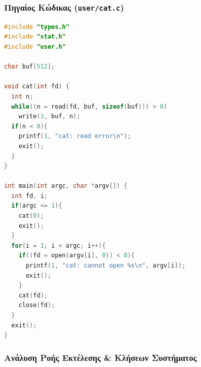 \documentclass[11pt,a4paper]{article}
\begin{document}
\subsubsection*{Πηγαίος Κώδικας (\texttt{user/cat.c})}
\begin{lstlisting}[language=C, caption={Πηγαίος κώδικας του προγράμματος cat (user/cat.c)}]
#include "types.h"
#include "stat.h"
#include "user.h"

char buf[512];

void cat(int fd) {
  int n;
  while((n = read(fd, buf, sizeof(buf))) > 0)
    write(1, buf, n);
  if(n < 0){
    printf(1, "cat: read error\n");
    exit();
  }
}

int main(int argc, char *argv[]) {
  int fd, i;
  if(argc <= 1){
    cat(0);
    exit();
  }
  for(i = 1; i < argc; i++){
    if((fd = open(argv[i], 0)) < 0){
      printf(1, "cat: cannot open %s\n", argv[i]);
      exit();
    }
    cat(fd);
    close(fd);
  }
  exit();
}
\end{lstlisting}

\clearpage
\subsubsection*{Ανάλυση Ροής Εκτέλεσης \& Κλήσεων Συστήματος}
\end{document}
